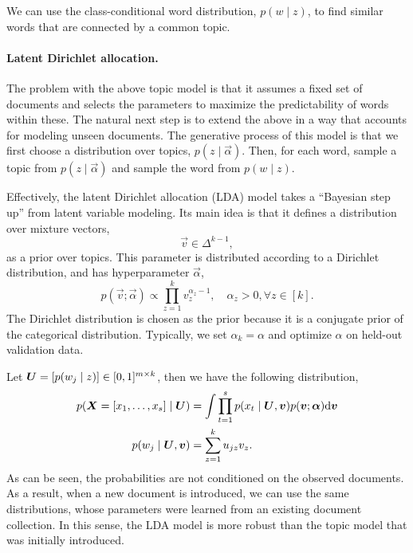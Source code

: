 \begin{important}
    We can use the class-conditional word distribution, $p(w \mid z)$, to find similar
    words that are connected by a common topic.
\end{important}

\paragraph{Latent Dirichlet allocation.}

The problem with the above topic model is that it assumes a fixed set of documents and selects the
parameters to maximize the predictability of words within these. The natural next step is to extend
the above in a way that accounts for modeling unseen documents. The generative process of this
model is that we first choose a distribution over topics, $p(z\mid \vec{\alpha})$. Then, for each
word, sample a topic from $p(z \mid \vec{\alpha})$ and sample the word from $p(w \mid z)$.

Effectively, the latent Dirichlet allocation (LDA) model takes a ``Bayesian step up'' from latent
variable modeling. Its main idea is that it defines a distribution over mixture vectors, \[
    \vec{v} \in \Delta^{k-1},
\]
as a prior over topics. This parameter is distributed according to a Dirichlet distribution, and
has hyperparameter $\vec{\alpha}$, \[
    p(\vec{v}; \vec{\alpha}) \propto \prod_{z=1}^{k} v_z^{\alpha_z - 1}, \quad \alpha_z > 0, \forall z \in [k].
\]
The Dirichlet distribution is chosen as the prior because it is a conjugate prior of the
categorical distribution. Typically, we set $\alpha_k = \alpha$ and optimize $\alpha$ on held-out
validation data.

Let $\bm{U} = [p(w_j \mid z)] \in [0,1]^{m \times k}$, then we have the following distribution,
\begin{align*}
    p(\bm{X}=[x_1, \ldots, x_s] \mid \bm{U}) & = \int \prod_{t=1}^{s} p(x_t \mid \bm{U}, \bm{v}) p(\bm{v}; \bm{\alpha}) \mathrm{d}\bm{v} \\
    p(w_j \mid \bm{U}, \bm{v})               & = \sum_{z=1}^{k} u_{jz} v_z.
\end{align*}
As can be seen, the probabilities are not conditioned on the observed documents. As a result, when a
new document is introduced, we can use the same distributions, whose parameters were learned from an
existing document collection. In this sense, the LDA model is more robust than the topic model that
was initially introduced.

